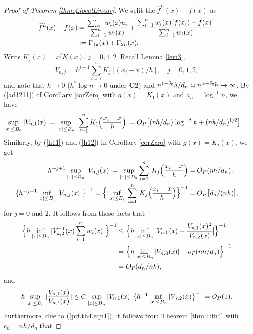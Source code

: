 \begin{proof}[Proof of Theorem \ref {thm:4:localLinear}]  We split the $\widehat{f}^L(x)-f(x)$ as
\begin{align}
\widehat{f}^L(x) - f(x) &= \frac{\sum_{i = 1}^n w_i(x) u_i }{\sum_{i = 1}^n w_i(x)} + \frac{\sum_{i = 1}^n w_i(x) \big [ f(x_i) - f(x) \big ] }{\sum_{i = 1}^n w_i(x)}  \no\\
&:= \Gamma_{1n}(x)  + \Gamma_{2n}(x). \la{prf.th4.eqn0}
\end{align}
Write $K_j(x) = x^jK(x)$, $j = 0, 1, 2$. Recall Lemma \ref {lem3}, $$V_{n,j}=h^{j-1}
\sum_{i=1}^nK_j[(x_i-x)/h],\quad  j=0,1,2,$$
 and note that   $h\to 0$ ($h^2\log n\to 0$ under {\bf C2}) and $n^{1 - \delta_0} h / d_n \asymp n^{\alpha - \delta_0 } h \to \infty$.
  By (\ref{ad1211}) of Corollary \ref{corZero} with $g(x) = K_1(x)$ and $a_n = \log^{-1}n$, we have
\begin{align}
\sup_{|x| \le B_n} |V_{n,1}(x)| &= \sup_{|x| \le B_n} |\sum_{i = 1}^n K_1 \Big (\frac{x_i - x}{h} \Big )   |  = O_P\big [(nh / d_n)\, \log^{-\Lambda}n + (nh / d_n)^{1/2} \big ]. \nonumber
\end{align}
Similarly, by (\ref{h11}) and (\ref{h12}) in Corollary \ref{corZero} with $g(x) = K_j(x)$, we get
\begin{align}
 h^{-j + 1}\sup_{|x| \le B_n} |V_{n,j}(x)|  =\sup_{|x|\le B_n} \sum_{i=1}^{n}\, K_j\Big (\frac{x_{i}-x}{h}\Big) &= O_P(nh/ d_n), \la{prf.th4.eqn1}\\
\big \{ h^{-j + 1}\inf_{|x| \le B_n} |V_{n,j}(x)| \big \}^{-1} =\Big \{\inf_{|x|\le B_n} \sum_{i=1}^{n}\, K_j\Big (\frac{x_{i}-x}{h}\Big )\Big \}^{-1} &= O_P\big[ d_n / (nh) \big],\la{prf.th4.eqn2}
\end{align}
for $j = 0$ and $ 2$. It follows from these facts  that
\begin{align}
\Big\{h\inf_{|x| \le B_n} | V^{-1}_{n, 2}(x) \sum_{i = 1}^n w_i(x) |\Big\}^{-1} &\le \Big\{h \inf_{|x| \le B_n}  \big |V_{n, 0}(x) - \frac{V_{n, 1}(x)^2}{V_{n,2}(x)} \big | \Big\}^{-1} \no\\
&= \Big\{ h \inf_{|x| \le B_n}  |V_{n, 0}(x)| - o_P(nh/d_n) \Big\}^{-1} \no\\
&= O_P (d_n/nh),\la{prf.th4.eqn3}
\end{align}
and
\begin{align}
h\sup_{|x| \le B_n} | \frac{ V_{n, 1}(x)}{V_{n,2}(x)}|\le C \sup_{|x| \le B_n}|V_{n, 1}(x)| \,\big \{h^{-1} \inf_{|x|\le B_n}|V_{n, 2}(x) \big \}^{-1} = O_P(1).\la{prf.th4.eqn4}
\end{align}
Furthermore, due to (\ref{prf.th4.eqn1}), it follows from Theorem \ref{thm:1:th4} with $c_n=nh/ d_n$ that

\end{proof}
